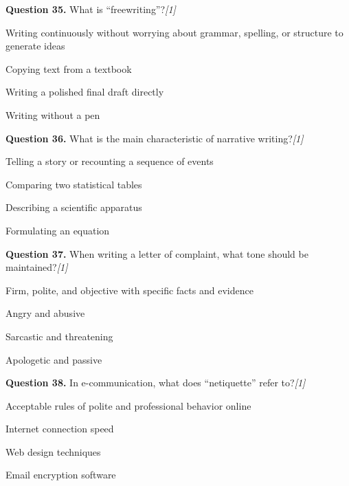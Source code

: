 \documentclass[11pt,a4paper]{article}
\newcommand{\pts}[1]{\hfill   \textit{[#1]}}
\begin{document}
\medskip




\noindent   \textbf{Question 35.} What is ``freewriting''?\pts{1}

\begin{parts}
  \item Writing continuously without worrying about grammar, spelling, or structure to generate ideas
  \item Copying text from a textbook
  \item Writing a polished final draft directly
  \item Writing without a pen
\end{parts}

\medskip




\noindent   \textbf{Question 36.} What is the main characteristic of narrative writing?\pts{1}

\begin{parts}
  \item Telling a story or recounting a sequence of events
  \item Comparing two statistical tables
  \item Describing a scientific apparatus
  \item Formulating an equation
\end{parts}

\medskip




\noindent   \textbf{Question 37.} When writing a letter of complaint, what tone should be maintained?\pts{1}

\begin{parts}
  \item Firm, polite, and objective with specific facts and evidence
  \item Angry and abusive
  \item Sarcastic and threatening
  \item Apologetic and passive
\end{parts}

\medskip




\noindent   \textbf{Question 38.} In e-communication, what does ``netiquette'' refer to?\pts{1}

\begin{parts}
  \item Acceptable rules of polite and professional behavior online
  \item Internet connection speed
  \item Web design techniques
  \item Email encryption software
\end{parts}
\end{document}
